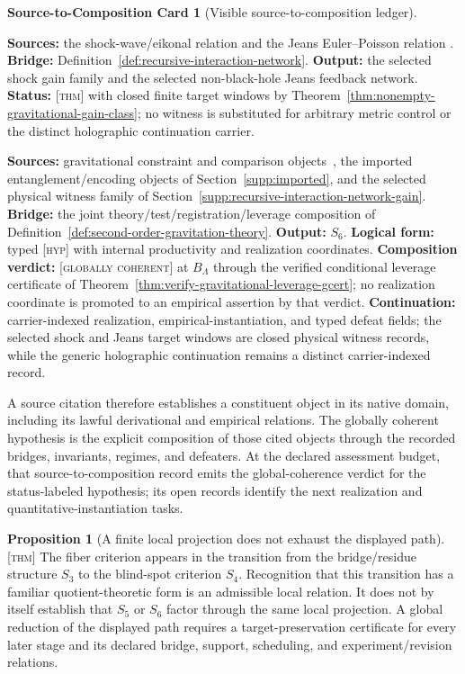 \documentclass[11pt]{article}
\newcommand{\GCpass}{\textsc{[globally coherent]}}
\newcommand{\Thm}{\textsc{[thm]}}
\newcommand{\Hyp}{\textsc{[hyp]}}
\theoremstyle{definition}
\newtheorem{sproposition}{Proposition}
\newtheorem{compositioncard}{Source-to-Composition Card}
\begin{document}
\begin{compositioncard}[Visible source-to-composition ledger]
\begin{description}
\textbf{Sources:} the shock-wave/eikonal relation
\cite{S_DraytHooft1985,S_ShenkerStanford2014,S_ShenkerStanford2014Multiple}
and the Jeans Euler--Poisson relation
\cite{S_Jeans1902,S_BinneyTremaine2008,S_Chavanis2010}.
\textbf{Bridge:} Definition~\ref{def:recursive-interaction-network}.
\textbf{Output:} the selected shock gain family and the selected non-black-hole
Jeans feedback network. \textbf{Status:} \Thm{} with closed finite target
windows by Theorem~\ref{thm:nonempty-gravitational-gain-class}; no witness is
substituted for arbitrary metric control or the distinct holographic continuation
carrier.
\item[$\mathsf{SC}_6$---second-order gravitation object.] \textbf{Sources:}
gravitational constraint and comparison objects~\cite{S_Will2014,S_Berti2015},
the imported entanglement/encoding objects of Section~\ref{supp:imported}, and
the selected physical witness family of Section~\ref{supp:recursive-interaction-network-gain}.
\textbf{Bridge:} the joint theory/test/registration/leverage composition of
Definition~\ref{def:second-order-gravitation-theory}. \textbf{Output:} $S_6$.
\textbf{Logical form:} typed \Hyp{} with internal productivity and
realization coordinates. \textbf{Composition verdict:} \GCpass{} at $B_\Lambda$
through the verified conditional leverage certificate of
Theorem~\ref{thm:verify-gravitational-leverage-gcert}; no realization coordinate
is promoted to an empirical assertion by that verdict.
\textbf{Continuation:} carrier-indexed realization, empirical-instantiation,
and typed defeat fields; the selected shock and Jeans target windows are closed
physical witness records, while the generic holographic continuation remains a
distinct carrier-indexed record.
\end{description}
A source citation therefore establishes a constituent object in its native
domain, including its lawful derivational and empirical relations. The globally
coherent hypothesis is the explicit composition of those cited objects through the
recorded bridges, invariants, regimes, and defeaters. At the declared assessment
budget, that source-to-composition record emits the global-coherence verdict for the
status-labeled hypothesis; its open records identify the next realization and
quantitative-instantiation tasks.
\end{compositioncard}

\begin{sproposition}[A finite local projection does not exhaust the displayed path]
\label{prop:finite-path-not-exhausted-by-quotient}
\Thm{} The fiber criterion appears in the transition from the bridge/residue
structure $S_3$ to the blind-spot criterion $S_4$. Recognition that this transition
has a familiar quotient-theoretic form is an admissible local relation. It does not
by itself establish that $S_5$ or $S_6$ factor through the same local projection.
A global reduction of the displayed path requires a target-preservation certificate
for every later stage and its declared bridge, support, scheduling, and
experiment/revision relations.
\end{sproposition}
\end{document}
